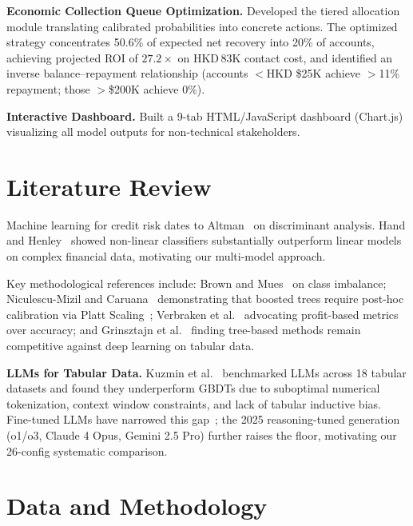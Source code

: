 \documentclass[11pt, a4paper]{article}
\begin{document}
\textbf{Economic Collection Queue Optimization.} Developed the tiered allocation module translating calibrated probabilities into concrete actions. The optimized strategy concentrates 50.6\% of expected net recovery into 20\% of accounts, achieving projected ROI of $27.2\times$ on HKD\,83K contact cost, and identified an inverse balance--repayment relationship (accounts $<$HKD \$25K achieve $>$11\% repayment; those $>$\$200K achieve 0\%).

\textbf{Interactive Dashboard.} Built a 9-tab HTML/JavaScript dashboard (Chart.js) visualizing all model outputs for non-technical stakeholders.


\section{Literature Review}\label{sec:litreview}

Machine learning for credit risk dates to Altman~\cite{altman1968} on discriminant analysis. Hand and Henley~\cite{hand1997} showed non-linear classifiers substantially outperform linear models on complex financial data, motivating our multi-model approach.

Key methodological references include: Brown and Mues~\cite{brown2012} on class imbalance; Niculescu-Mizil and Caruana~\cite{niculescu2005} demonstrating that boosted trees require post-hoc calibration via Platt Scaling~\cite{platt1999}; Verbraken et al.~\cite{verbraken2014} advocating profit-based metrics over accuracy; and Grinsztajn et al.~\cite{grinsztajn2022} finding tree-based methods remain competitive against deep learning on tabular data.

\textbf{LLMs for Tabular Data.} Kuzmin et al.~\cite{kuzmin2024tabllm} benchmarked LLMs across 18 tabular datasets and found they underperform GBDTs due to suboptimal numerical tokenization, context window constraints, and lack of tabular inductive bias. Fine-tuned LLMs have narrowed this gap~\cite{Grinsztajn2024LLM}; the 2025 reasoning-tuned generation (o1/o3, Claude 4 Opus, Gemini 2.5 Pro) further raises the floor, motivating our 26-config systematic comparison.


\section{Data and Methodology}\label{sec:methodology}
\end{document}
